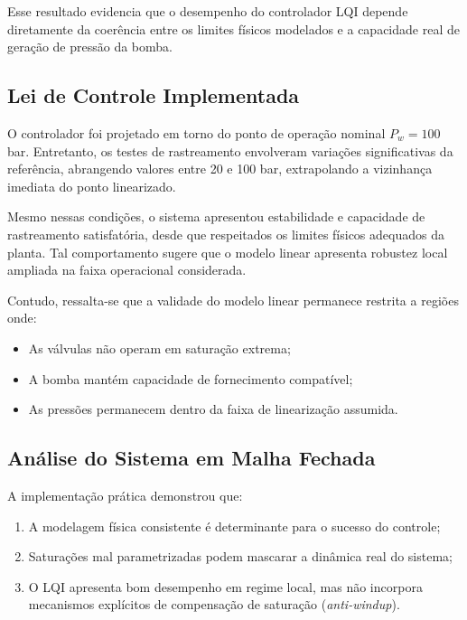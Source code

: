 Esse resultado evidencia que o desempenho do controlador LQI depende diretamente da coerência entre os limites físicos modelados e a capacidade real de geração de pressão da bomba.

\subsection{Lei de Controle Implementada}

O controlador foi projetado em torno do ponto de operação nominal $P_w = 100$ bar. Entretanto, os testes de rastreamento envolveram variações significativas da referência, abrangendo valores entre 20 e 100 bar, extrapolando a vizinhança imediata do ponto linearizado.

Mesmo nessas condições, o sistema apresentou estabilidade e capacidade de rastreamento satisfatória, desde que respeitados os limites físicos adequados da planta. Tal comportamento sugere que o modelo linear apresenta robustez local ampliada na faixa operacional considerada.

Contudo, ressalta-se que a validade do modelo linear permanece restrita a regiões onde:

\begin{itemize}
    \item As válvulas não operam em saturação extrema;
    \item A bomba mantém capacidade de fornecimento compatível;
    \item As pressões permanecem dentro da faixa de linearização assumida.
\end{itemize}

\subsection{Análise do Sistema em Malha Fechada}

A implementação prática demonstrou que:

\begin{enumerate}
    \item A modelagem física consistente é determinante para o sucesso do controle;
    \item Saturações mal parametrizadas podem mascarar a dinâmica real do sistema;
    \item O LQI apresenta bom desempenho em regime local, mas não incorpora mecanismos explícitos de compensação de saturação (\textit{anti-windup}).
\end{enumerate}

